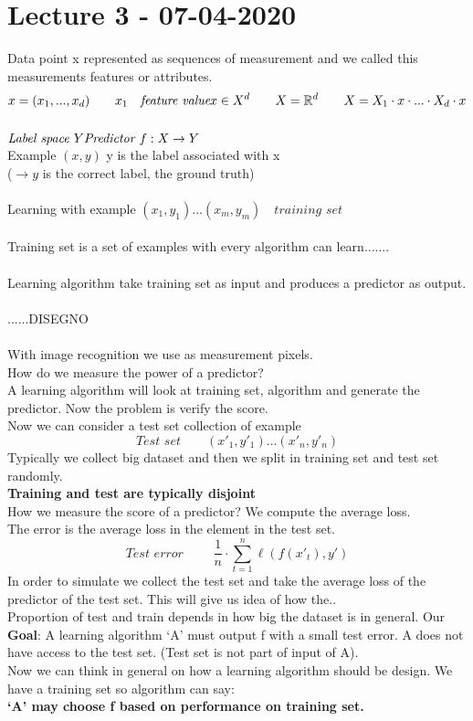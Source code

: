 \documentclass[../main.tex]{subfiles}
\begin{document}
\section{Lecture 3 - 07-04-2020}
Data point x represented as sequences of measurement and we called this
measurements features or attributes.\\
$$ x = (x_1,..., x_d)  \qquad x_1 \quad \textit{feature value}
x \in X^d \qquad X = \mathbb{R}^d \qquad X = X_1 \cdot x \cdot ... \cdot X_d \cdot x
$$
\\
$
\textit{Label space } Y\\
\textit{Predictor } f : X \rightarrow Y \\
$
\\
Example $(x,y)$ \qquad y is the label associated with x\\
($ \rightarrow y$ is the correct label, the ground truth)\\
\\
Learning with example $(x_1,y_1)...(x_m,y_m)  \quad \textit{training set} $\\\\
Training set is a set of examples with every algorithm can learn.......\\\\
Learning algorithm take training set as input and produces a predictor as output.\\\\
 ......DISEGNO \\\\
With image recognition we use as measurement pixels.\\
How do we measure the power of a predictor?\\
A learning algorithm will look at training set, algorithm and generate the predictor. Now the problem is verify the score. \\
Now we can consider a test set collection of example
\\
$$ \textit{Test set} \qquad(x'_1, y'_1)...(x'_n,y'_n) $$
Typically we collect big dataset and then we split in training set and test set
randomly.\\
\textbf{Training and test are typically disjoint}
\\
How we measure the score of a predictor? We compute the average loss.\\
The error is the average loss in the element in the test set.\\
$$
\textit{Test error }\qquad \frac{1}{n}\cdot \sum_{t=1}^{n} \ell(f(x'_t),y')
$$
In order to simulate we collect the test set and take the average loss of the predictor of the test set. This will give us idea of how the.. \\
Proportion of test and train depends in how big the dataset is in general.
Our \textbf{Goal}: A learning algorithm ‘A’ must output f with a small test error.
A does not have access to the test set. (Test set is not part of input of A).\\
Now we can think in general on how a learning algorithm should be design.
We have a training set so algorithm can say:\\
\textbf{‘A’ may choose f based on performance on training set.}
\end{document}
